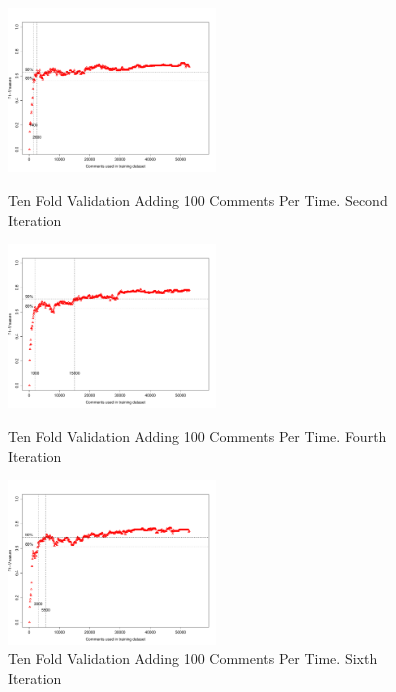 \begin{figure}[thb!]
  \centering
  \vspace{-14mm}
  \includegraphics[width=0.49\textwidth]{figures/appendix/ten_fold_validation_requirement/ten_fold_validation_1_100.pdf}
  \vspace{-5mm}
  \caption{Ten Fold Validation Adding 100 Comments Per Time. Second Iteration}
  \label{fig:requirement_ten_fold_validation_1_100}
  \includegraphics[width=0.49\textwidth]{figures/appendix/ten_fold_validation_requirement/ten_fold_validation_3_100.pdf}
  \vspace{-5mm}
  \caption{Ten Fold Validation Adding 100 Comments Per Time. Fourth Iteration}
  \label{fig:requirement_ten_fold_validation_3_100}
  \includegraphics[width=0.49\textwidth]{figures/appendix/ten_fold_validation_requirement/ten_fold_validation_5_100.pdf}
  \vspace{-5mm}
  \caption{Ten Fold Validation Adding 100 Comments Per Time. Sixth Iteration}
  \label{fig:requirement_ten_fold_validation_5_100}
\end{figure}

